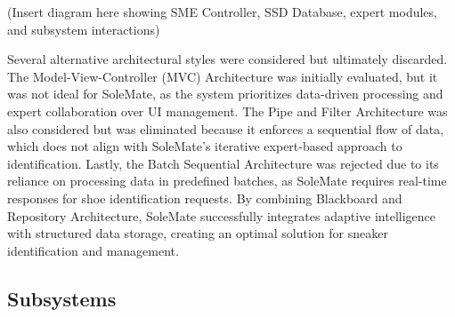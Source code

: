 \documentclass[]{article}
\begin{document}
(Insert diagram here showing SME Controller, SSD Database, expert modules, and subsystem interactions)

Several alternative architectural styles were considered but ultimately discarded. The Model-View-Controller (MVC) Architecture was initially evaluated, but it was not ideal for SoleMate, as the system prioritizes data-driven processing and expert collaboration over UI management. The Pipe and Filter Architecture was also considered but was eliminated because it enforces a sequential flow of data, which does not align with SoleMate’s iterative expert-based approach to identification. Lastly, the Batch Sequential Architecture was rejected due to its reliance on processing data in predefined batches, as SoleMate requires real-time responses for shoe identification requests. By combining Blackboard and Repository Architecture, SoleMate successfully integrates adaptive intelligence with structured data storage, creating an optimal solution for sneaker identification and management.

\subsection{Subsystems}
\label{sub:subsystems}
\end{document}

